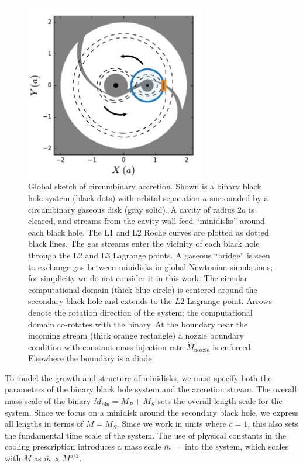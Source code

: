 \begin{figure}
\begin{center}
\includegraphics[width=0.7\textwidth]{figures/minidisk/domain.pdf}
\end{center}
\caption{ Global sketch of circumbinary accretion.  Shown is a binary black hole system (black dots) with orbital separation $a$ surrounded by a circumbinary gaseous disk (gray solid).  A cavity of radius $2a$ is cleared, and streams from the cavity wall feed ``minidisks'' around each black hole. The L1 and L2 Roche curves are plotted as dotted black lines.  The gas streams enter the vicinity of each black hole through the L2 and L3 Lagrange points.  A gaseous ``bridge'' is seen to exchange gas between minidisks in global Newtonian simulations; for simplicity we do not consider it in this work.  The circular computational domain (thick blue circle) is centered around the secondary black hole and extends to the $L2$ Lagrange point.  Arrows denote the rotation direction of the system; the computational domain co-rotates with the binary.  At the boundary near the incoming stream (thick orange rectangle) a nozzle boundary condition with constant mass injection rate $\dot{M}_\text{nozzle}$ is enforced.  Elsewhere the boundary is a diode.} 
\end{figure}

To model the growth and structure of minidisks, we must specify both the parameters of the binary black hole system and the accretion stream.  The overall mass scale of the binary $M_\text{bin} = M_P+M_S$ sets the overall length scale for the system.  Since we focus on a minidisk around the secondary black hole, we express all lengths in terms of $M = M_S$.  Since we work in units where $c=1$, this also sets the fundamental time scale of the system. The use of physical constants in the cooling prescription  introduces a mass scale $\bar{m}=$ into the system, which scales with $M$ as $\bar{m} \propto M^{5/2}$.  

